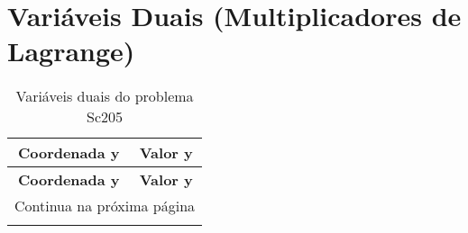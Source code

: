 \documentclass[12pt]{article}
\begin{document}
\section{Variáveis Duais (Multiplicadores de Lagrange)}

\begin{longtable}{@{}cc@{}}
\caption{Variáveis duais do problema Sc205} \\
\toprule
\textbf{Coordenada y} & \textbf{Valor y} \\
\midrule
\endfirsthead

\toprule
\textbf{Coordenada y} & \textbf{Valor y} \\
\midrule
\endhead

\midrule \multicolumn{2}{r}{{Continua na próxima página}} \\ \midrule
\endfoot


\end{longtable}
\end{document}
